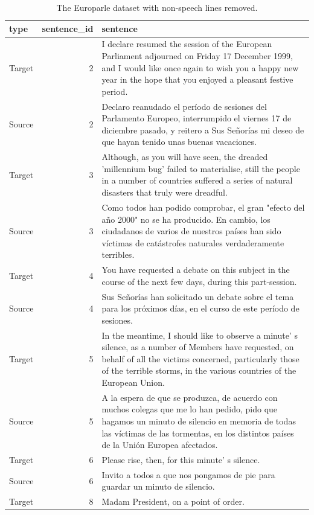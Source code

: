 \documentclass[
]{article}
\begin{document}
\begin{table}

\caption{\label{tab:normalize-non-speech-remove-europarle}The Europarle dataset with non-speech lines removed.}
\centering
\begin{tabular}[t]{lrl}
\toprule
type & sentence\_id & sentence\\
\midrule
Target & 2 & I declare resumed the session of the European Parliament adjourned on Friday 17 December 1999, and I would like once again to wish you a happy new year in the hope that you enjoyed a pleasant festive period.\\
Source & 2 & Declaro reanudado el período de sesiones del Parlamento Europeo, interrumpido el viernes 17 de diciembre pasado, y reitero a Sus Señorías mi deseo de que hayan tenido unas buenas vacaciones.\\
Target & 3 & Although, as you will have seen, the dreaded 'millennium bug' failed to materialise, still the people in a number of countries suffered a series of natural disasters that truly were dreadful.\\
Source & 3 & Como todos han podido comprobar, el gran "efecto del año 2000" no se ha producido. En cambio, los ciudadanos de varios de nuestros países han sido víctimas de catástrofes naturales verdaderamente terribles.\\
Target & 4 & You have requested a debate on this subject in the course of the next few days, during this part-session.\\
\addlinespace
Source & 4 & Sus Señorías han solicitado un debate sobre el tema para los próximos días, en el curso de este período de sesiones.\\
Target & 5 & In the meantime, I should like to observe a minute' s silence, as a number of Members have requested, on behalf of all the victims concerned, particularly those of the terrible storms, in the various countries of the European Union.\\
Source & 5 & A la espera de que se produzca, de acuerdo con muchos colegas que me lo han pedido, pido que hagamos un minuto de silencio en memoria de todas las víctimas de las tormentas, en los distintos países de la Unión Europea afectados.\\
Target & 6 & Please rise, then, for this minute' s silence.\\
Source & 6 & Invito a todos a que nos pongamos de pie para guardar un minuto de silencio.\\
\addlinespace
Target & 8 & Madam President, on a point of order.\\

\end{tabular}
\end{table}
\end{document}

